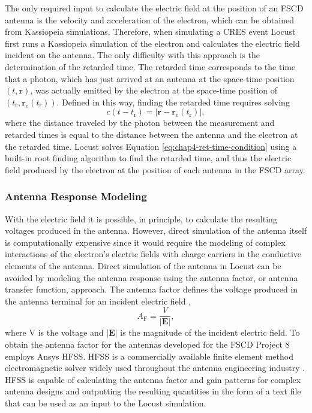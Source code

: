 The only required input to calculate the electric field at the position of an FSCD antenna is the velocity and acceleration of the electron, which can be obtained from Kassiopeia simulations. Therefore, when simulating a CRES event Locust first runs a Kassiopeia simulation of the electron and calculates the electric field incident on the antenna. The only difficulty with this approach is the determination of the retarded time. The retarded time corresponds to the time that a photon, which has just arrived at an antenna at the space-time position $(t,\bm{r})$, was actually emitted by the electron at the space-time position of $(t_\mathrm{r}, \bm{r}_e(t_\mathrm{r}))$. Defined in this way, finding the retarded time requires solving 
\begin{equation}
    c(t-t_\mathrm{r}) = |\bm{r}-\bm{r}_e(t_\mathrm{r})|,
    \label{eq:chap4-ret-time-condition}
\end{equation}
where the distance traveled by the photon between the measurement and retarded times is equal to the distance between the antenna and the electron at the retarded time. Locust solves Equation \ref{eq:chap4-ret-time-condition} using a built-in root finding algorithm to find the retarded time, and thus the electric field produced by the electron at the position of each antenna in the FSCD array.

\subsubsection*{Antenna Response Modeling}

With the electric field it is possible, in principle, to calculate the resulting voltages produced in the antenna. However, direct simulation of the antenna itself is computationally expensive since it would require the modeling of complex interactions of the electron's electric fields with charge carriers in the conductive elements of the antenna. Direct simulation of the antenna in Locust can be avoided by modeling the antenna response using the antenna factor, or antenna transfer function, approach. The antenna factor defines the voltage produced in the antenna terminal for an incident electric field \cite{balanis2015antenna},
\begin{equation}
    A_\mathrm{F}=\frac{V}{|\bm{E}|},
\end{equation}
where V is the voltage and $|\bm{E}|$ is the magnitude of the incident electric field. To obtain the antenna factor for the antennas developed for the FSCD Project 8 employs Ansys HFSS. HFSS is a commercially available finite element method electromagnetic solver widely used throughout the antenna engineering industry \cite{hfss}. HFSS is capable of calculating the antenna factor and gain patterns for complex antenna designs and outputting the resulting quantities in the form of a text file that can be used as an input to the Locust simulation. 

